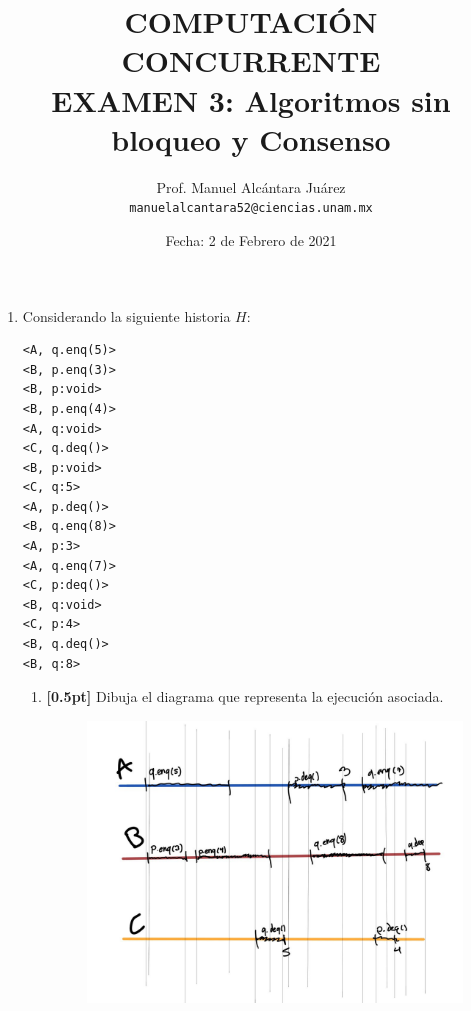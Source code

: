 \documentclass[a4paper,11pt]{article}
\begin{document}
    \title{COMPUTACIÓN CONCURRENTE \\ {\Large EXAMEN 3: Algoritmos sin bloqueo y Consenso}}
    \author{
    	Prof. Manuel Alcántara Juárez \\
    	\texttt{manuelalcantara52@ciencias.unam.mx}
    }
    \date{Fecha: 2 de Febrero de 2021}

	\maketitle
	\pagestyle{fancy}

	\fancyhf{}
	\fancyfoot[c]{\thepage}

\begin{enumerate}

    \item{Considerando la siguiente historia $H$:
    \begin{verbatim}
<A, q.enq(5)>
<B, p.enq(3)>
<B, p:void>
<B, p.enq(4)>
<A, q:void>
<C, q.deq()>
<B, p:void>
<C, q:5>
<A, p.deq()>
<B, q.enq(8)>
<A, p:3>
<A, q.enq(7)>
<C, p:deq()>
<B, q:void>
<C, p:4>
<B, q.deq()>
<B, q:8>
    \end{verbatim}
    \begin{enumerate}
        \item{
          \textbf{[0.5pt]} Dibuja el diagrama que representa la ejecución asociada.
          \begin{figure}[!h]
            \includegraphics[width=\textwidth]{Graphics/1}
          \end{figure}

}
\end{enumerate}}
\end{enumerate}
\end{document}
